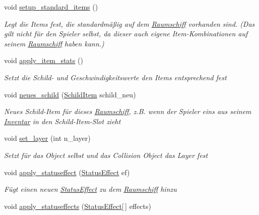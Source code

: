 \begin{DoxyCompactItemize}
\item 
void \hyperlink{class_spaceship_a65c885ff5b2c4b2142d02ed093d734a2}{setup\+\_\+standard\+\_\+items} ()
\begin{DoxyCompactList}\small\item\em Legt die Items fest, die standardmäßig auf dem \hyperlink{class_raumschiff}{Raumschiff} vorhanden sind. (Das gilt nicht für den Spieler selbst, da dieser auch eigene Item-\/\+Kombinationen auf seinem \hyperlink{class_raumschiff}{Raumschiff} haben kann.) \end{DoxyCompactList}\item 
void \hyperlink{class_spaceship_a465e9ba15923826055b2fd43be83d635}{apply\+\_\+item\+\_\+stats} ()
\begin{DoxyCompactList}\small\item\em Setzt die Schild-\/ und Geschwindigkeitswerte den Items entsprechend fest \end{DoxyCompactList}\item 
void \hyperlink{class_spaceship_a51fd63c3c0bf5f1bb5d5d7e05db87056}{neues\+\_\+schild} (\hyperlink{class_schild_item}{Schild\+Item} schild\+\_\+neu)
\begin{DoxyCompactList}\small\item\em Neues Schild-\/\+Item für dieses \hyperlink{class_raumschiff}{Raumschiff}, z.\+B. wenn der Spieler eins aus seinem \hyperlink{class_inventar}{Inventar} in den Schild-\/\+Item-\/\+Slot zieht \end{DoxyCompactList}\item 
void \hyperlink{class_spaceship_a627ae269cfe0db00d361c9e4a8ce2413}{set\+\_\+layer} (int n\+\_\+layer)
\begin{DoxyCompactList}\small\item\em Setzt für das Object selbst und das Collision Object das Layer fest \end{DoxyCompactList}\item 
void \hyperlink{class_spaceship_a0e562e25b6f8186c569fbc0577ef3bb6}{apply\+\_\+statuseffect} (\hyperlink{class_status_effect}{Status\+Effect} ef)
\begin{DoxyCompactList}\small\item\em Fügt einen neuen \hyperlink{class_status_effect}{Status\+Effect} zu dem \hyperlink{class_raumschiff}{Raumschiff} hinzu \end{DoxyCompactList}\item 
void \hyperlink{class_spaceship_a4170fcea7d1c1cb131e634a28ad3b271}{apply\+\_\+statuseffects} (\hyperlink{class_status_effect}{Status\+Effect}\mbox{[}$\,$\mbox{]} effects)

\end{DoxyCompactItemize}
